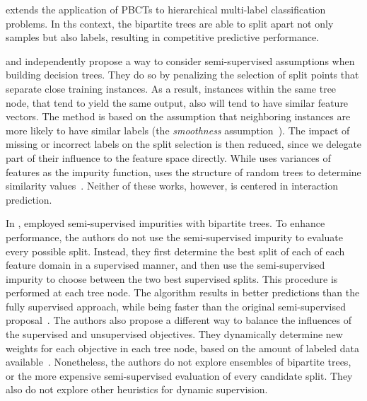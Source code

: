 \begin{itemize}
 extends the application of PBCTs to hierarchical multi-label classification problems. In ths context, the bipartite trees are able to split apart not only samples but also labels, resulting in competitive predictive performance.

 and  independently propose a way to consider semi-supervised assumptions when building decision trees.
They do so by penalizing the selection of split points that separate close training instances. As a result, instances within the same tree node, that tend to yield the same output, also will tend to have similar feature vectors.
The method is based on the assumption that neighboring instances are more likely to have similar labels (the \emph{smoothness} assumption~\cite{chapelle2006semisupervised,vanengelen2020survey}). The impact of missing or incorrect labels on the split selection is then reduced, since we delegate part of their influence to the feature space directly.
%
While  uses variances of features as the impurity function,  uses the structure of random trees to determine similarity values~\cite{liu2008isolation}. Neither of these works, however, is centered in interaction prediction.

In \citeyear{alves2023semisupervised},  employed semi-supervised impurities with bipartite trees.
To enhance performance, the authors do not use the semi-supervised impurity to evaluate every possible split. Instead, they first determine the best split of each of each feature domain in a supervised manner, and then use the semi-supervised impurity to choose between the two best supervised splits. This procedure is performed at each tree node. The algorithm results in better predictions than the fully supervised approach, while being faster than the original semi-supervised proposal~\cite{alves2023semisupervised}.
The authors also propose a different way to balance the influences of the supervised and unsupervised objectives. They dynamically determine new weights for each objective in each tree node, based on the amount of labeled data available~\cite{alves2023semisupervised}.
Nonetheless, the authors do not explore ensembles of bipartite trees, or the more expensive semi-supervised evaluation of every candidate split. They also do not explore other heuristics for dynamic supervision.



\end{itemize}
